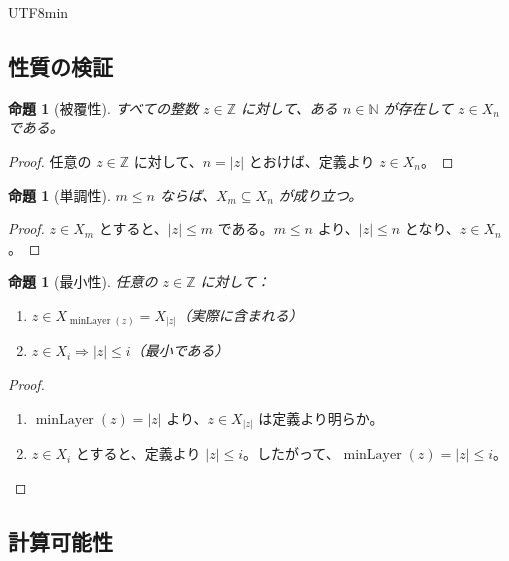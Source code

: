 \documentclass[12pt,a4paper]{article}
\newtheorem{proposition}[theorem]{命題}
\theoremstyle{definition}
\theoremstyle{remark}
\newcommand{\N}{\mathbb{N}}
\newcommand{\Z}{\mathbb{Z}}
\DeclareMathOperator{\minLayer}{minLayer}
\begin{document}
\begin{CJK}{UTF8}{min}
\begin{center}
\end{center}

\subsection{性質の検証}

\begin{proposition}[被覆性]
すべての整数 $z \in \Z$ に対して、ある $n \in \N$ が存在して $z \in X_n$ である。
\end{proposition}

\begin{proof}
任意の $z \in \Z$ に対して、$n = |z|$ とおけば、定義より $z \in X_n$。
\end{proof}

\begin{proposition}[単調性]
$m \leq n$ ならば、$X_m \subseteq X_n$ が成り立つ。
\end{proposition}

\begin{proof}
$z \in X_m$ とすると、$|z| \leq m$ である。$m \leq n$ より、$|z| \leq n$ となり、$z \in X_n$。
\end{proof}

\begin{proposition}[最小性]
任意の $z \in \Z$ に対して：
\begin{enumerate}
\item $z \in X_{\minLayer(z)} = X_{|z|}$（実際に含まれる）
\item $z \in X_i \Rightarrow |z| \leq i$（最小である）
\end{enumerate}
\end{proposition}

\begin{proof}
\begin{enumerate}
\item $\minLayer(z) = |z|$ より、$z \in X_{|z|}$ は定義より明らか。
\item $z \in X_i$ とすると、定義より $|z| \leq i$。したがって、$\minLayer(z) = |z| \leq i$。
\end{enumerate}
\end{proof}

\subsection{計算可能性}


\end{CJK}
\end{document}

